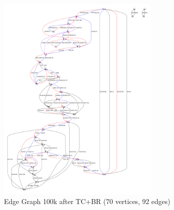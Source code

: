 \documentclass[14pt]{article}
\begin{document}
\begin{figure}
\begin{center}
\includegraphics[width=0.7\textwidth]{bulges_removed.pdf}
\end{center}
\caption{Edge Graph 100k after TC+BR (70 vertices, 92 edges)}
\end{figure}
\end{document}
